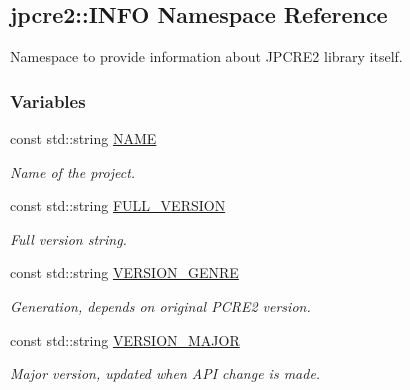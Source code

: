 \hypertarget{namespacejpcre2_1_1INFO}{}\subsection{jpcre2\+:\+:I\+N\+FO Namespace Reference}
\label{namespacejpcre2_1_1INFO}


Namespace to provide information about J\+P\+C\+R\+E2 library itself.  


\subsubsection*{Variables}
\begin{DoxyCompactItemize}
\item 
const std\+::string \hyperlink{namespacejpcre2_1_1INFO_a0d5716a82b496f2ccf5eee832275b4b8_a0d5716a82b496f2ccf5eee832275b4b8}{N\+A\+ME}
\begin{DoxyCompactList}\small\item\em Name of the project. \end{DoxyCompactList}\item 
\hypertarget{namespacejpcre2_1_1INFO_a315fc58da1463f4d1cc417677bd31ca1}{}\label{namespacejpcre2_1_1INFO_a315fc58da1463f4d1cc417677bd31ca1} 
const std\+::string \hyperlink{namespacejpcre2_1_1INFO_a315fc58da1463f4d1cc417677bd31ca1}{F\+U\+L\+L\+\_\+\+V\+E\+R\+S\+I\+ON}
\begin{DoxyCompactList}\small\item\em Full version string. \end{DoxyCompactList}\item 
\hypertarget{namespacejpcre2_1_1INFO_a9d046526610d624eaaa04b5fb000e48f}{}\label{namespacejpcre2_1_1INFO_a9d046526610d624eaaa04b5fb000e48f} 
const std\+::string \hyperlink{namespacejpcre2_1_1INFO_a9d046526610d624eaaa04b5fb000e48f}{V\+E\+R\+S\+I\+O\+N\+\_\+\+G\+E\+N\+RE}
\begin{DoxyCompactList}\small\item\em Generation, depends on original P\+C\+R\+E2 version. \end{DoxyCompactList}\item 
\hypertarget{namespacejpcre2_1_1INFO_a5deb805502c30063a5a68d91bf034d86}{}\label{namespacejpcre2_1_1INFO_a5deb805502c30063a5a68d91bf034d86} 
const std\+::string \hyperlink{namespacejpcre2_1_1INFO_a5deb805502c30063a5a68d91bf034d86}{V\+E\+R\+S\+I\+O\+N\+\_\+\+M\+A\+J\+OR}
\begin{DoxyCompactList}\small\item\em Major version, updated when A\+PI change is made. \end{DoxyCompactList}\item 

\end{DoxyCompactItemize}
